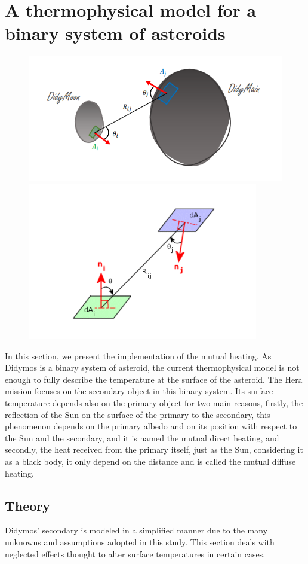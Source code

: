 \section{A thermophysical model for a binary system of asteroids}
\label{sec:4}

\begin{figure}[t]
    \centering
    \includegraphics[width=0.4\linewidth]{rsc/viewfac1.png} 
    \includegraphics[width=0.4\linewidth]{rsc/viewfac2.png}
    \label{fig:4.1}
\end{figure}

In this section, we present the implementation of the mutual heating. As Didymos is a binary system of asteroid, the current thermophysical model is not enough to fully describe the temperature at the surface of the asteroid. The Hera mission focuses on the secondary object in this binary system. Its surface temperature depends also on the primary object for two main reasons, firstly, the reflection of the Sun on the surface of the primary to the secondary, this phenomenon depends on the primary albedo and on its position with respect to the Sun and the secondary, and it is named the mutual direct heating, and secondly, the heat received from the primary itself, just as the Sun, considering it as a black body, it only depend on the distance and is called the mutual diffuse heating.

\subsection{Theory}

Didymos’ secondary is modeled in a simplified manner due to the many unknowns and assumptions adopted in this study. This section deals with neglected effects thought to alter surface temperatures in certain cases.

